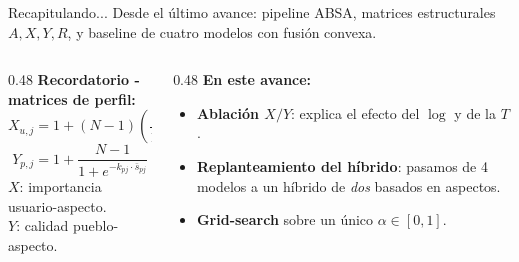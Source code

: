 \documentclass[aspectratio=169,11pt]{beamer}
\begin{document}
\begin{frame}{Recapitulando...}
	\small
	Desde el \'ultimo avance: pipeline ABSA, matrices estructurales $A,X,Y,R$, y baseline de cuatro modelos con fusi\'on convexa.
	\vspace{0.6em}
	\begin{columns}[T]
		\begin{column}{0.48\linewidth}
			\textbf{Recordatorio - matrices de perfil:}
			\[
				X_{u,j}=1+(N-1)\!\left(\frac{2}{1+e^{-t_{uj}}}-1\right)
			\]
			\[
				Y_{p,j}=1+\frac{N-1}{1+e^{-k_{pj}\cdot \bar{s}_{pj}}}
			\]
			$X$: importancia usuario-aspecto.\\
			$Y$: calidad pueblo-aspecto.
		\end{column}
		\begin{column}{0.48\linewidth}
			\textbf{En este avance:}
			\begin{itemize}
				\item \textbf{Ablaci\'on $X/Y$}: explica el efecto del $\log$ y de la $T$.
				\item \textbf{Replanteamiento del h\'ibrido}: pasamos de 4 modelos a un h\'ibrido de \emph{dos} basados en aspectos.
				\item \textbf{Grid-search} sobre un \'unico $\alpha \in [0,1]$.
			\end{itemize}
		\end{column}
	\end{columns}
\end{frame}
\end{document}
